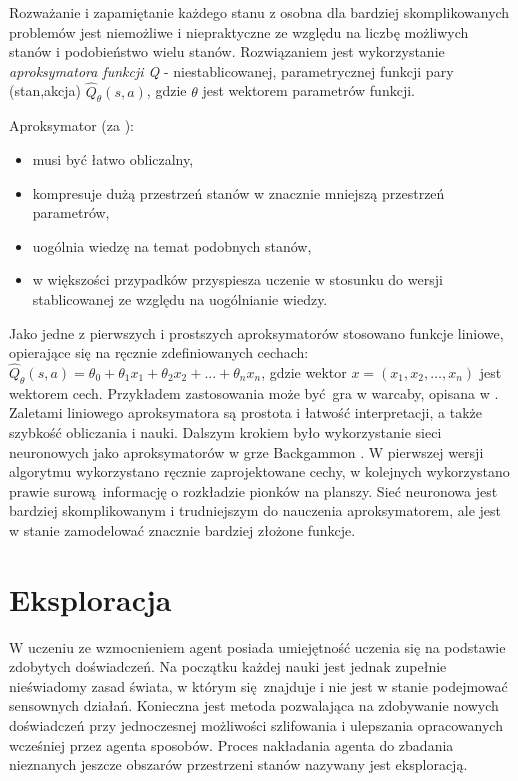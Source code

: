 \documentclass[polish,master,a4paper,oneside]{ppfcmthesis}
\begin{document}
Rozważanie i zapamiętanie każdego stanu z osobna dla bardziej skomplikowanych problemów jest niemożliwe i niepraktyczne ze względu na liczbę możliwych stanów i podobieństwo wielu stanów. Rozwiązaniem jest wykorzystanie \textit {aproksymatora funkcji Q} - niestablicowanej, parametrycznej funkcji pary (stan,akcja) $\hat{Q}_{\theta}(s,a)$, gdzie $\theta$ jest wektorem parametrów funkcji.

\pagebreak

Aproksymator (za \cite{wjaskowski2016}):
\begin{itemize}
\item musi być łatwo obliczalny,
\item kompresuje dużą przestrzeń stanów w znacznie mniejszą przestrzeń parametrów,
\item uogólnia wiedzę na temat podobnych stanów,
\item w większości przypadków przyspiesza uczenie w stosunku do wersji stablicowanej ze względu na uogólnianie wiedzy.
\end{itemize}

Jako jedne z pierwszych i prostszych aproksymatorów stosowano funkcje liniowe, opierające się na ręcznie zdefiniowanych cechach: $\hat{Q}_{\theta}(s,a) = \theta_0 + \theta_1x_1 + \theta_2x_2 + ... + \theta_nx_n$, gdzie wektor $x = (x_1, x_2, …, x_n)$ jest wektorem cech. Przykładem zastosowania może być gra w warcaby, opisana w \cite{Samuel:1959:SML:1661923.1661924}. Zaletami liniowego aproksymatora są prostota i łatwość interpretacji, a także szybkość obliczania i nauki. 
Dalszym krokiem było wykorzystanie sieci neuronowych jako aproksymatorów w grze Backgammon \cite{Tesauro1992451}. W pierwszej wersji algorytmu wykorzystano ręcznie zaprojektowane cechy, w kolejnych wykorzystano prawie surową informację o rozkładzie pionków na planszy. Sieć neuronowa jest bardziej skomplikowanym i trudniejszym do nauczenia aproksymatorem, ale jest w stanie zamodelować znacznie bardziej złożone funkcje.
 \section{Eksploracja}
W uczeniu ze wzmocnieniem agent posiada umiejętność uczenia się na podstawie zdobytych doświadczeń. Na początku każdej nauki jest jednak zupełnie nieświadomy zasad świata, w którym się znajduje i nie jest w stanie podejmować sensownych działań. Konieczna jest metoda pozwalająca na zdobywanie nowych doświadczeń przy jednoczesnej możliwości szlifowania i ulepszania opracowanych wcześniej przez agenta sposobów. Proces nakładania agenta do zbadania nieznanych jeszcze obszarów przestrzeni stanów nazywany jest eksploracją.
\end{document}
